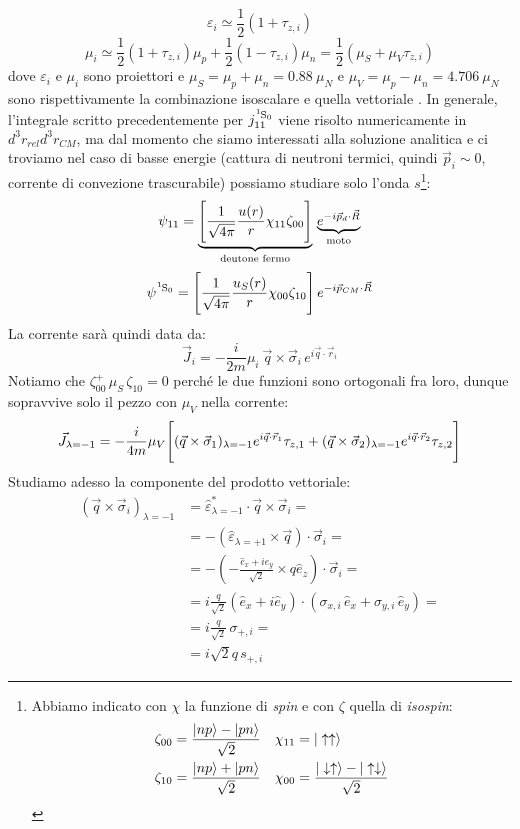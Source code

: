 $$\varepsilon_i \simeq \frac{1}{2}(1+\tau_{z,i})$$
$$\mu_i \simeq \frac{1}{2}(1+\tau_{z,i})\mu_p + \frac{1}{2}(1-\tau_{z,i})\mu_n = \frac{1}{2} (\mu_S +\mu_V \tau_{z,i}) $$
dove $\varepsilon_i$ e $\mu_i$ sono proiettori e $\mu_S = \mu_p + \mu_n = 0.88\: \mu_N $ e $\mu_V = \mu_p - \mu_n = 4.706 \: \mu_N$ sono rispettivamente la combinazione isoscalare e quella vettoriale . In generale, l'integrale scritto precedentemente per $j_{11}^{\ce{^1S_0}}$ viene risolto numericamente in $d^3r_{rel}d^3r_{CM}$, ma dal momento che siamo interessati alla soluzione analitica e ci troviamo nel caso di basse energie (cattura di neutroni termici, quindi $\vec{p}_i\sim 0$, corrente di convezione trascurabile) possiamo studiare solo l'onda $s$\footnote{Abbiamo indicato con $\chi$ la funzione di \textit{spin} e con $\zeta$ quella di \textit{isospin}:%
\begin{displaymath}
\begin{aligned}
\zeta_{00} &= \frac{|np\rangle-|pn\rangle}{\sqrt{2}} & \chi_{11} &= |\uparrow\uparrow\rangle \\
\zeta_{10} &= \frac{|np\rangle+|pn\rangle}{\sqrt{2}} & \chi_{00} &= \frac{|\downarrow\uparrow\rangle-|\uparrow\downarrow\rangle}{\sqrt{2}} 
\end{aligned}
\end{displaymath}%
}:
$$\psi_{11} = \underbrace{\Biggl [ \frac{1}{\sqrt{4\pi}}\frac{u(r)}{r}\chi_{11}\zeta_{00} \Biggr ]}_\text{deutone fermo}\, \underbrace{e^{-i\vec{p}_d\cdot\vec{R}}}_\text{moto}$$
$$\psi^{\ce{^1S_0}} = \PPq{\frac{1}{\sqrt{4\pi}}\frac{u_S(r)}{r}\chi_{00}\zeta_{10}}\, e^{-i\vec{p}_{CM}\cdot\vec{R}}$$
La corrente sarà quindi data da:
$$\vec{J}_i = -\frac{i}{2m} \mu_i\: \vec{q}\times \vec{\sigma}_i\, e^{i\vec{q}\cdot \vec{r}_i}$$
Notiamo che $\zeta_{00}^+\, \mu_S\, \zeta_{10} = 0$ perché le due funzioni sono ortogonali fra loro, dunque sopravvive solo il pezzo con $\mu_V$ nella corrente:
$$\vec{J}_{\lambda=-1} = -\frac{i}{4m} \mu_V \Biggl [ (\vec{q}\times\vec{\sigma}_1)_{\lambda=-1} e^{i\vec{q}\cdot\vec{r}_1}\tau_{z,1} + (\vec{q}\times\vec{\sigma}_2)_{\lambda=-1} e^{i\vec{q}\cdot\vec{r}_2}\tau_{z,2} \Biggr ] $$
Studiamo adesso la componente del prodotto vettoriale:
\begin{displaymath}
\begin{aligned}
(\vec{q}\times\vec{\sigma}_i)_{\lambda=-1} &= \widehat{\varepsilon}_{\lambda=-1}^* \cdot \vec{q}\times\vec{\sigma}_i =\\
&= -(\widehat{\varepsilon}_{\lambda=+1} \times \vec{q})\cdot\vec{\sigma}_i =\\
&=-(-\frac{\hat{e}_x + i\hat{e}_y}{\sqrt{2}} \times q\hat{e}_z)\cdot\vec{\sigma}_i =\\
&= i \frac{q}{\sqrt{2}} (\hat{e}_x + i\hat{e}_y)\cdot (\sigma_{x,i}\,\hat{e}_x + \sigma_{y,i}\,\hat{e}_y)=\\
&= i \frac{q}{\sqrt{2}}\, \sigma_{+,i} =\\
&= i \sqrt{2} q \, s_{+,i} 
\end{aligned}
\end{displaymath}
